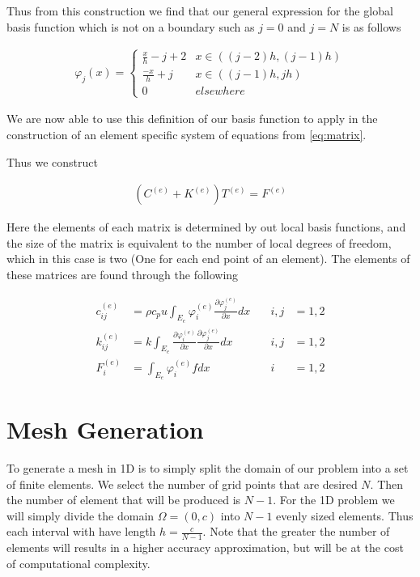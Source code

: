 \documentclass[10pt]{amsart}
\numberwithin{equation}{section}
\theoremstyle{definition}
\newcommand{\pder}[2][]{\frac{\partial#1}{\partial#2}}
\begin{document}
\begin{multicols}{2}
Thus from this construction we find that our general expression for the global
basis function which is not on a boundary such as $j=0$ and $j=N$ is as follows

\begin{align}
  \varphi_j(x)=\begin{cases}
    \frac{x}{h}-j+2 & x \in ((j-2)h,(j-1)h)\\
    \frac{-x}{h}+j & x \in ((j-1)h,jh)\\
    0 & elsewhere
  \end{cases}
\end{align}

We are now able to use this definition of our basis function to apply in the
construction of an element specific system of equations from \eqref{eq:matrix}.

Thus we construct

\begin{align}
  \left(C^{(e)}+K^{(e)}\right)T^{(e)}=F^{(e)}
\end{align}

Here the elements of each matrix is determined by out local basis functions, and
the size of the matrix is equivalent to the number of local degrees of freedom,
which in this case is two (One for each end point of an element). The elements
of these matrices are found through the following

\begin{align*}
  c_{ij}^{(e)}&=\rho c_p u\int_{E_e}\varphi_i^{(e)}\pder[\varphi_j^{(e)}]{x}dx\quad
              &i,j&=1,2\\
  k_{ij}^{(e)}&=k\int_{E_e}\pder[\varphi_i^{(e)}]{x}\pder[\varphi_j^{(e)}]{x}dx\quad
              &i,j&=1,2\\
  F_i^{(e)}&=\int_{E_e}\varphi_i^{(e)}fdx &i&=1,2
\end{align*}

\section{Mesh Generation}%
\label{sec:mesh_generation}

To generate a mesh in 1D is to simply split the domain of our problem into a
set of finite elements. We select the number of grid points that are desired
$N$. Then the number of element that will be produced is $N-1$. For the 1D
problem we will simply divide the domain $\Omega=(0,c)$ into $N-1$ evenly sized
elements. Thus each interval with have length $h=\frac{c}{N-1}$. Note that the
greater the number of elements will results in a higher accuracy approximation,
but will be at the cost of computational complexity.


\end{multicols}
\end{document}
